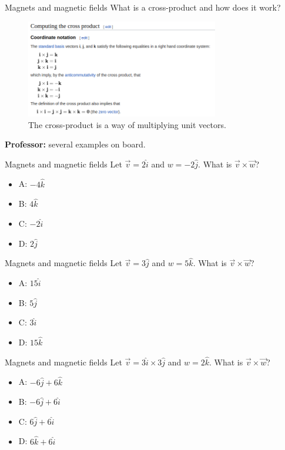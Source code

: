 \documentclass{beamer}
\begin{document}
\begin{frame}{Magnets and magnetic fields}
What is a cross-product and how does it work? \\ \vspace{0.25cm}
\begin{figure}
\centering
\includegraphics[width=0.75\textwidth]{figures/crossP.png}
\caption{\label{fig:crossP} The cross-product is a way of multiplying unit vectors.}
\end{figure}
\textbf{Professor:} several examples on board.
\end{frame}

\begin{frame}{Magnets and magnetic fields}
Let $\vec{v} = 2\hat{i}$ and $w = -2 \hat{j}$.  What is $\vec{v} \times \vec{w}$?
\begin{itemize}
\item A: $-4 \hat{k}$
\item B: $4 \hat{k}$
\item C: $-2 \hat{i}$
\item D: $2 \hat{j}$
\end{itemize}
\end{frame}

\begin{frame}{Magnets and magnetic fields}
Let $\vec{v} = 3\hat{j}$ and $w = 5 \hat{k}$.  What is $\vec{v} \times \vec{w}$?
\begin{itemize}
\item A: $15 \hat{i}$
\item B: $5 \hat{j}$
\item C: $3 \hat{i}$
\item D: $15 \hat{k}$
\end{itemize}
\end{frame}

\begin{frame}{Magnets and magnetic fields}
Let $\vec{v} = 3\hat{i} \times 3\hat{j}$ and $w = 2 \hat{k}$.  What is $\vec{v} \times \vec{w}$?
\begin{itemize}
\item A: $-6 \hat{j} + 6\hat{k}$
\item B: $-6 \hat{j} + 6\hat{i}$
\item C: $6 \hat{j} + 6\hat{i}$
\item D: $6 \hat{k} + 6\hat{i}$
\end{itemize}
\end{frame}
\end{document}
